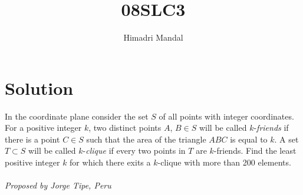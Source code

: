 \documentclass[11pt]{scrartcl}
\title{08SLC3}
\author{Himadri Mandal}
\begin{document}
\maketitle

\section{Solution}
\begin{problem}[08SLC3]
In the coordinate plane consider the set $ S$ of all points with integer coordinates. For a positive integer $ k$, two distinct points $A$, $ B\in S$ will be called $ k$-\textit{friends} if there is a point $ C\in S$ such that the area of the triangle $ ABC$ is equal to $ k$. A set $ T\subset S$ will be called $ k$-\textit{clique} if every two points in $ T$ are $ k$-friends. Find the least positive integer $ k$ for which there exits a $ k$-clique with more than 200 elements. \\\\
\textit{Proposed by Jorge Tipe, Peru}
\end{problem}
\end{document}
